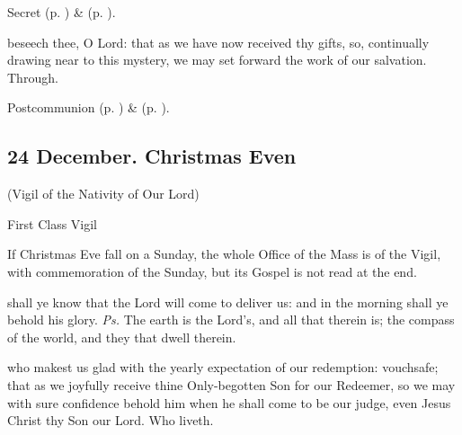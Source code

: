 \begin{rubric}
     Secret  (p. \pageref{AdventISecret}) \&   (p. \pageref{SPMaryInAdvent}).
\end{rubric}


\postcommunion
{} beseech thee, O Lord: that as we have now received thy gifts, so, continually drawing near to this mystery, we may set forward the work of our salvation. Through.

\begin{rubric}
     Postcommunion  (p. \pageref{AdventIPostcommunion}) \&   (p. \pageref{SPMaryInAdvent}).
\end{rubric}


\clearpage
\subsection{24 December. Christmas Even}

\centerline{\small{(Vigil of the Nativity of Our Lord)}}

\begin{inhead}
	First Class Vigil
\end{inhead}



\begin{rubric}
    If Christmas Eve fall on a Sunday, the whole Office of the Mass is of the Vigil, with commemoration of the Sunday, but its Gospel is not read at the end.
\end{rubric}

\introit
{} shall ye know that the Lord will come to deliver us: and in the morning shall ye behold his glory. \textit{Ps.} The earth is the Lord's, and all that therein is; the compass of the world, and they that dwell therein.

\collect
{} who makest us glad with the yearly expectation of our redemption: vouchsafe; that as we joyfully receive thine Only-begotten Son for our Redeemer, so we may with sure confidence behold him when he shall come to be our judge, even Jesus Christ thy Son our Lord. Who liveth.

